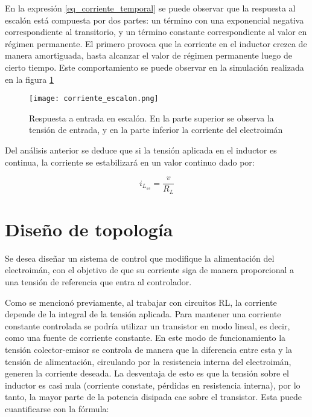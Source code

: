 En la expresión \ref{eq_corriente_temporal} se puede observar que la respuesta al escalón está compuesta por dos partes: un término con una exponencial negativa correspondiente al transitorio, y un término constante correspondiente al valor en régimen permanente. El primero provoca que la corriente en el inductor crezca de manera amortiguada, hasta alcanzar el valor de régimen permanente luego de cierto tiempo. Este comportamiento se puede observar en la simulación realizada en la figura \ref{fig:img_respuesta_escalon}

\begin{figure}[H]
	\centering
	\texttt{[image: corriente\_escalon.png]}
	\caption{Respuesta a entrada en escalón. En la parte superior se observa la tensión de entrada, y en la parte inferior la corriente del electroimán}
	\label{fig:img_respuesta_escalon}
\end{figure}


Del análisis anterior se deduce que si la tensión aplicada en el inductor es continua, la corriente se estabilizará en un valor continuo dado por:

\begin{equation} \label{eq_corriente_ss}
	i_{L_{ss}}=\frac{v}{R_L}
\end{equation}



\section{Diseño de topología}

Se desea diseñar un sistema de control que modifique la alimentación del electroimán, con el objetivo de que su corriente siga de manera proporcional a una tensión de referencia que entra al controlador.

Como se mencionó previamente, al trabajar con circuitos RL, la corriente depende de la integral de la tensión aplicada. Para mantener una corriente constante controlada se podría utilizar un transistor en modo lineal, es decir, como una fuente de corriente constante. En este modo de funcionamiento la tensión colector-emisor se controla de manera que la diferencia entre esta y la tensión de alimentación, circulando por la resistencia interna del electroimán, generen la corriente deseada. La desventaja de esto es que la tensión sobre el inductor es casi nula (corriente constate, pérdidas en resistencia interna), por lo tanto, la mayor parte de la potencia disipada cae sobre el transistor. Esta puede cuantificarse con la fórmula: 

